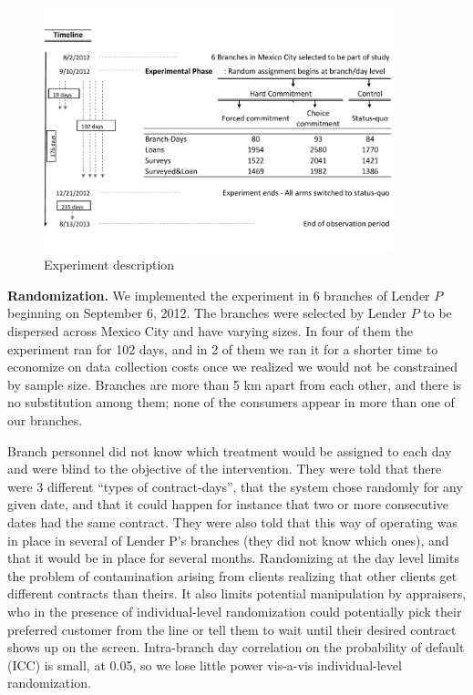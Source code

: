 \documentclass[11pt, a4paper]{article}
\begin{document}
\begin{figure}[htbp]    
\begin{center}
\includegraphics[width=0.9\textwidth]{Figuras/consort.pdf}
  \end{center}
 \caption{Experiment description}
     \label{exp_description}
\end{figure}


\vspace{.2in}
\noindent \textbf{Randomization.}  We implemented the experiment in 6 branches of Lender $P$ beginning on September 6, 2012. The branches were selected by Lender $P$ to be dispersed across Mexico City and have varying sizes. In four of them the experiment ran for 102 days, and in 2 of them we ran it for a shorter time to economize on data collection costs once we realized we would not be constrained by sample size. %
Branches are more than 5 km apart from each other, and there is no substitution among them; none of the consumers appear in more than one of our branches.

Branch personnel did not know which treatment would be assigned to each day and were blind to the objective of the intervention. They were told that there were 3 different ``types of contract-days'', that the system chose randomly for any given date, and that it could happen for instance that two or more consecutive dates had the same contract. They were also told that this way of operating was in place in several of Lender P's branches (they did not know which ones), and that it would be in place for several months. Randomizing at the day level limits the problem of contamination arising from clients realizing that other clients get different contracts than theirs. It also limits potential manipulation by appraisers, who in the presence of individual-level randomization could potentially pick their preferred customer from the line or tell them to wait until their desired contract shows up on the screen. Intra-branch day correlation on the probability of default (ICC) is small, at {0.05}, so we lose little power vis-a-vis individual-level randomization.
\end{document}
